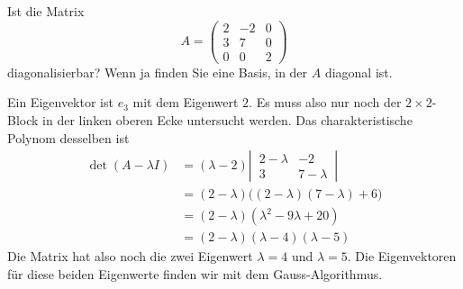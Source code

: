 Ist die Matrix
\[
A=
\begin{pmatrix}
2&-2&0\\
3& 7&0\\
0& 0&2
\end{pmatrix}
\]
diagonalisierbar? Wenn ja finden Sie eine Basis, in der $A$ diagonal ist.


\begin{loesung}
Ein Eigenvektor ist $e_3$ mit dem Eigenwert $2$. Es muss also nur noch
der $2\times 2$-Block in der linken oberen Ecke untersucht werden.
Das charakteristische Polynom desselben ist
\begin{align*}
\det(A-\lambda I)
&=
(\lambda -2)\left|\,\begin{matrix}2-\lambda&-2\\3&7-\lambda\end{matrix}\,\right|
\\
&=(2-\lambda)\bigl( (2-\lambda)(7-\lambda)+6 \bigr)
\\
&=(2-\lambda)(\lambda^2-9\lambda+20)
\\
&=(2-\lambda)(\lambda-4)(\lambda -5)
\end{align*}
Die Matrix hat also noch die zwei Eigenwert $\lambda=4$ und $\lambda=5$.
Die Eigenvektoren für diese beiden Eigenwerte finden wir mit dem
Gauss-Algorithmus.


\end{loesung}
